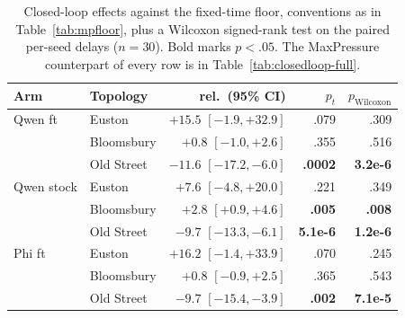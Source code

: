 \begin{table}[t]
\centering
\small
\begin{tabular}{llrrr}
\toprule
Arm & Topology & rel.\ (95\% CI) & $p_t$ & $p_{\text{Wilcoxon}}$ \\
\midrule
Qwen ft & Euston & $+15.5$ $[-1.9, +32.9]$ & .079 & .309 \\
 & Bloomsbury & $+0.8$ $[-1.0, +2.6]$ & .355 & .516 \\
 & Old Street & $\mathbf{-11.6}$ $[-17.2, -6.0]$ & \textbf{.0002} & \textbf{3.2e-6} \\
Qwen stock & Euston & $+7.6$ $[-4.8, +20.0]$ & .221 & .349 \\
 & Bloomsbury & $\mathbf{+2.8}$ $[+0.9, +4.6]$ & \textbf{.005} & \textbf{.008} \\
 & Old Street & $\mathbf{-9.7}$ $[-13.3, -6.1]$ & \textbf{5.1e-6} & \textbf{1.2e-6} \\
Phi ft & Euston & $+16.2$ $[-1.4, +33.9]$ & .070 & .245 \\
 & Bloomsbury & $+0.8$ $[-0.9, +2.5]$ & .365 & .543 \\
 & Old Street & $\mathbf{-9.7}$ $[-15.4, -3.9]$ & \textbf{.002} & \textbf{7.1e-5} \\
\bottomrule
\end{tabular}
\caption{Closed-loop effects against the fixed-time floor, conventions as
in Table~\ref{tab:mpfloor}, plus a Wilcoxon
signed-rank test on the paired per-seed delays ($n{=}30$). Bold marks
$p<.05$. The MaxPressure counterpart of every row is in
Table~\ref{tab:closedloop-full}.}
\label{tab:robust}
\end{table}

